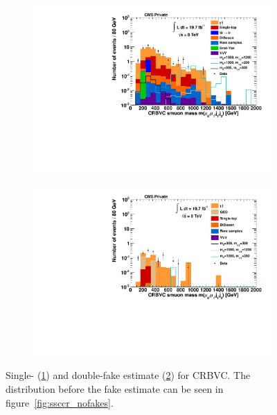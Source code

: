 \begin{figure}[!htbp]
  \centering
  \begin{subfigure}[b]{0.495\textwidth}
    \centering
    \includegraphics[width=\textwidth]{plots/CR6_m_smuon_singlefake.pdf}
    \caption{\label{fig:CRBVC_m_smuon_singlefake}}
  \end{subfigure}
  \begin{subfigure}[b]{0.495\textwidth}
    \centering
    \includegraphics[width=\textwidth]{plots/CR6_m_smuon_doublefake.pdf}
    \caption{\label{fig:CRBVC_m_smuon_doublefake}}
  \end{subfigure}

  \caption{Single- (\ref{fig:CRBVC_m_smuon_singlefake}) and double-fake estimate (\ref{fig:CRBVC_m_smuon_doublefake}) for CRBVC. The distribution before the fake estimate can be seen in figure~\ref{fig:ssccr_nofakes}.}
  \label{fig:fakeestimates}
\end{figure}

